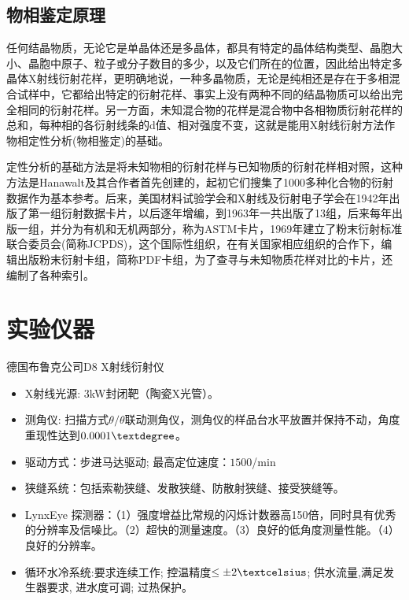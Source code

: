 \documentclass[a4paper]{article}
\begin{document}
\subsection{物相鉴定原理}

任何结晶物质，无论它是单晶体还是多晶体，都具有特定的晶体结构类型、晶胞大小、晶胞中原子、粒子或分子数目的多少，以及它们所在的位置，因此给出特定多晶体X射线衍射花样，更明确地说，一种多晶物质，无论是纯相还是存在于多相混合试样中，它都给出特定的衍射花样、事实上没有两种不同的结晶物质可以给出完全相同的衍射花样。另一方面，未知混合物的花样是混合物中各相物质衍射花样的总和，每种相的各衍射线条的d值、相对强度不变，这就是能用X射线衍射方法作物相定性分析(物相鉴定)的基础。

定性分析的基础方法是将未知物相的衍射花样与已知物质的衍射花样相对照，这种方法是Hanawalt及其合作者首先创建的，起初它们搜集了1000多种化合物的衍射数据作为基本参考。后来，美国材料试验学会和X射线及衍射电子学会在1942年出版了第一组衍射数据卡片，以后逐年增编，到1963年一共出版了13组，后来每年出版一组，并分为有机和无机两部分，称为ASTM卡片，1969年建立了粉末衍射标准联合委员会(简称JCPDS)，这个国际性组织，在有关国家相应组织的合作下，编辑出版粉末衍射卡组，简称PDF卡组，为了查寻与未知物质花样对比的卡片，还编制了各种索引。


\section{实验仪器}
德国布鲁克公司D8 X射线衍射仪
\begin{itemize}
	\item X射线光源: 3kW封闭靶（陶瓷X光管）。
	\item 测角仪: 扫描方式$ \theta/\theta $联动测角仪，测角仪的样品台水平放置并保持不动，角度重现性达到$ 0.0001\textdegree $。
	\item 驱动方式：步进马达驱动; 最高定位速度：$ 1500 $\textdegree/min
	\item 狭缝系统：包括索勒狭缝、发散狭缝、防散射狭缝、接受狭缝等。
	\item LynxEye 探测器：（1）强度增益比常规的闪烁计数器高150倍，同时具有优秀的分辨率及信噪比。（2）超快的测量速度。（3）良好的低角度测量性能。（4）良好的分辨率。
	\item 循环水冷系统:要求连续工作; 控温精度$ \leq \pm 2\textcelsius $; 供水流量,满足发生器要求, 进水度可调; 过热保护。
\end{itemize}
\end{document}

